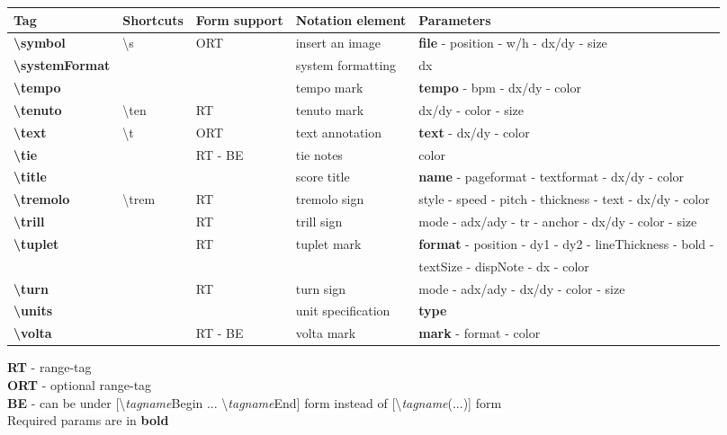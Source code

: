 \documentclass[a4paper, landscape, 10pt]{article}
\begin{document}
%
%
\begin{tabularx}{\linewidth}{p{3cm}p{4.5cm}p{3cm}p{5.5cm}l}
    \hline
    \textbf{Tag}&\textbf{Shortcuts}&\textbf{Form support}&\textbf{Notation element}&\textbf{Parameters}\\
    \hline
    \textbf{\textbackslash{}symbol}&\textbackslash{}s&ORT&insert an image&\textbf{file} - position - w/h - dx/dy - size\\
    \hline
    \textbf{\textbackslash{}systemFormat}&&&system formatting&dx\\
    \hline
    \textbf{\textbackslash{}tempo}&&&tempo mark&\textbf{tempo} - bpm - dx/dy - color\\
    \hline
    \textbf{\textbackslash{}tenuto}&\textbackslash{}ten&RT&tenuto mark&dx/dy - color - size\\
    \hline
    \textbf{\textbackslash{}text}&\textbackslash{}t&ORT&text annotation&\textbf{text} - dx/dy - color\\
    \hline
    \textbf{\textbackslash{}tie}&&RT - BE&tie notes&color\\
    \hline
    \textbf{\textbackslash{}title}&&&score title&\textbf{name} - pageformat - textformat - dx/dy - color\\
    \hline
    \textbf{\textbackslash{}tremolo}&\textbackslash{}trem&RT&tremolo sign&style - speed - pitch - thickness - text - dx/dy - color\\
    \hline
    \textbf{\textbackslash{}trill}&&RT&trill sign&mode - adx/ady - tr - anchor - dx/dy - color - size\\
    \hline
    \textbf{\textbackslash{}tuplet}&&RT&tuplet mark&\textbf{format} - position - dy1 - dy2 - lineThickness - bold -\\
    &&&& textSize - dispNote - dx - color\\
    \hline
    \textbf{\textbackslash{}turn}&&RT&turn sign&mode - adx/ady - dx/dy - color - size\\
    \hline
    \textbf{\textbackslash{}units}&&&unit specification&\textbf{type}\\
    \hline
    \textbf{\textbackslash{}volta}&&RT - BE&volta mark&\textbf{mark} - format - color\\
    \hline
\end{tabularx}

\bigskip

\textbf{RT} - range-tag \\
\textbf{ORT} - optional range-tag \\
\textbf{BE} - can be under [\textbackslash{}\emph{tagname}Begin ... \textbackslash{}\emph{tagname}End] form instead of [\textbackslash{}\emph{tagname}(...)] form\\
Required params are in \textbf{bold}
\end{document}
